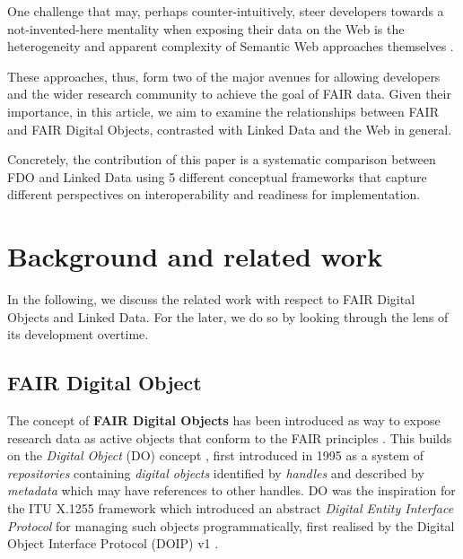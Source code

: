 \documentclass[fleqn,10pt,lineno]{wlpeerjlua}
\begin{document}
One challenge that may, perhaps counter-intuitively, steer developers towards a not-invented-here mentality \autocite{stefiDevelopersMakeUnbiased2015,stefiDevelopReuseTwo2015a} when exposing their data on the Web is the heterogeneity and apparent complexity of Semantic Web approaches themselves \autocite{merono-penuelaWebDataApis2021b}.

These approaches, thus, form two of the major avenues for allowing developers and the wider research community to achieve the goal of FAIR data. Given their importance, in this article, we aim to examine the relationships between FAIR and FAIR Digital Objects, contrasted with Linked Data and the Web in general.

Concretely, the contribution of this paper is a systematic comparison between FDO and Linked Data using 5 different conceptual frameworks that capture different perspectives on interoperability and readiness for implementation.

\hypertarget{sec:background}{%
\section*{Background and related work}\label{sec:background}}

In the following, we discuss the related work with respect to FAIR Digital Objects and Linked Data. For the later, we do so by looking through the lens of its development overtime.

\hypertarget{sec:fdo}{%
\subsection*{FAIR Digital Object}\label{sec:fdo}}

The concept of \textbf{FAIR Digital Objects} \autocite{schultesFAIRPrinciplesDigital2019a} has been introduced as way to expose research data as active objects that conform to the FAIR principles \autocite{wilkinsonFAIRGuidingPrinciples2016e}. This builds on the \emph{Digital Object} (DO) concept \autocite{kahnFrameworkDistributedDigital2006b}, first introduced in 1995 \autocite{kahnFrameworkDistributedDigital1995a} as a system of \emph{repositories} containing \emph{digital objects} identified by \emph{handles} and described by \emph{metadata} which may have references to other handles. DO was the inspiration for the ITU X.1255 framework \autocite{x1255FrameworkDiscovery} which introduced an abstract \emph{Digital Entity Interface Protocol} for managing such objects programmatically, first realised by the Digital Object Interface Protocol (DOIP) v1 \autocite{DigitalObjectInterface}.
\end{document}
